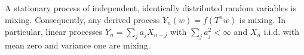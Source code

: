 A stationary process of independent, identically distributed random variables is mixing. Consequently, any derived process $Y_n(w) = f(T^n w)$ is mixing. In particular, linear processes $Y_n = \sum_{j} a_j X_{n-j}$ with $\sum_j a_j^2 < \infty$ and $X_n$ i.i.d. with mean zero and variance one are mixing.
